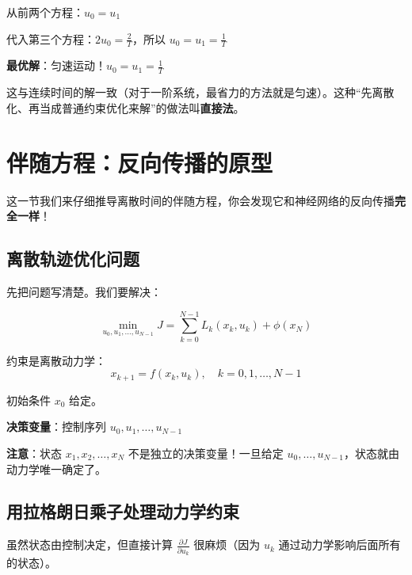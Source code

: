 从前两个方程：$u_0 = u_1$

代入第三个方程：$2u_0 = \frac{2}{T}$，所以 $u_0 = u_1 = \frac{1}{T}$

\textbf{最优解}：匀速运动！$u_0 = u_1 = \frac{1}{T}$

这与连续时间的解一致（对于一阶系统，最省力的方法就是匀速）。这种“先离散化、再当成普通约束优化来解”的做法叫\textbf{直接法}。

\section{伴随方程：反向传播的原型}

这一节我们来仔细推导离散时间的伴随方程，你会发现它和神经网络的反向传播\textbf{完全一样}！

\subsection{离散轨迹优化问题}

先把问题写清楚。我们要解决：

\begin{equation}
\min_{u_0, u_1, \ldots, u_{N-1}} J = \sum_{k=0}^{N-1} L_k(x_k, u_k) + \phi(x_N)
\end{equation}

约束是离散动力学：
\begin{equation}
x_{k+1} = f(x_k, u_k), \quad k = 0, 1, \ldots, N-1
\end{equation}

初始条件 $x_0$ 给定。

\textbf{决策变量}：控制序列 $u_0, u_1, \ldots, u_{N-1}$

\textbf{注意}：状态 $x_1, x_2, \ldots, x_N$ 不是独立的决策变量！一旦给定 $u_0, \ldots, u_{N-1}$，状态就由动力学唯一确定了。

\subsection{用拉格朗日乘子处理动力学约束}

虽然状态由控制决定，但直接计算 $\frac{\partial J}{\partial u_k}$ 很麻烦（因为 $u_k$ 通过动力学影响后面所有的状态）。

